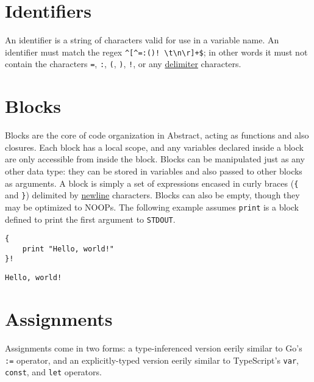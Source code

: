\documentclass[letterpaper,titlepage]{scrreprt}
\begin{document}
\section{Identifiers}
\label{sec:Identifiers}

An identifier is a string of characters valid for use in a variable name. An identifier must match the regex \lstinline{^[^=:()! \t\n\r]+$}; in other words it must not contain the characters \lstinline{=}, \lstinline{:}, \lstinline{(}, \lstinline{)}, \lstinline{!}, or any \hyperref[def:delimiter]{delimiter} characters.

\section{Blocks}
\label{sec:Blocks}

Blocks are the core of code organization in Abstract, acting as functions and also closures. Each block has a local scope, and any variables declared inside a block are only accessible from inside the block. Blocks can be manipulated just as any other data type: they can be stored in variables and also passed to other blocks as arguments. A block is simply a set of expressions encased in curly braces (\lstinline|{| and \lstinline|}|) delimited by \hyperref[def:newline]{newline} characters. Blocks can also be empty, though they may be optimized to NOOPs. The following example assumes \lstinline{print} is a block defined to print the first argument to \lstinline{STDOUT}.

\begin{lstlisting}[caption={Example block},label=lst:exampleblock]
{
	print "Hello, world!"
}!
\end{lstlisting}
\begin{lstlisting}[caption={Example block output},label=lst:exampleblockoutput]
Hello, world!
\end{lstlisting}

\section{Assignments}
\label{sec:Assignment}

Assignments come in two forms: a type-inferenced version eerily similar to Go's \lstinline{:=} operator, and an explicitly-typed version eerily similar to TypeScript's \lstinline{var}, \lstinline{const}, and \lstinline{let} operators.
\end{document}
